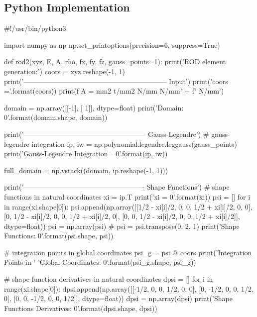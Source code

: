 \subsection{Python Implementation}
\begin{python}
#!/usr/bin/python3

import numpy as np
np.set_printoptions(precision=6, suppress=True)

def rod2(xyz, E, A, rho, fx, fy, fz, gauss_points=1):
    print('\nStarting ROD element generation:\n')
    coors = xyz.reshape(-1, 1)
    print('-------------------------------------------------------------- Input')
    print('coors ='.format(coors))
    print(f'{A = } mm2 t/mm2 N/mm N/mm' +
          f' N/mm\n')

    domain = np.array([[-1],
                       [ 1]], dtype=float)
    print('Domain: {0}\n'.format(domain.shape, domain))

    print('----------------------------------------------------- Gauss-Legendre')
    # gauss-legendre integration
    ip, iw = np.polynomial.legendre.leggauss(gauss_points)
    print('Gauss-Legendre Integration\nip = {0}\n'.format(ip, iw))

    full_domain = np.vstack((domain, ip.reshape(-1, 1)))

    print('---------------------------------------------------- Shape Functions')
    # shape functions in natural coordinates
    xi = ip.T
    print('xi = {0}\n'.format(xi))
    psi = []
    for i in range(xi.shape[0]):
        psi.append(np.array([[1/2 - xi[i]/2, 0, 0, 1/2 + xi[i]/2, 0, 0],
                            [0, 1/2 - xi[i]/2, 0, 0, 1/2 + xi[i]/2, 0],
                            [0, 0, 1/2 - xi[i]/2, 0, 0, 1/2 + xi[i]/2]],
                   dtype=float))
    psi = np.array(psi)
    # psi = psi.transpose(0, 2, 1)
    print('Shape Functions: {0}\n'.format(psi.shape, psi))

    # integration points in global coordinates
    psi_g = psi @ coors
    print('Integration Points in '
          'Global Coordinates: {0}\n'.format(psi_g.shape, psi_g))

    # shape function derivatives in natural coordinates
    dpsi = []
    for i in range(xi.shape[0]):
        dpsi.append(np.array([[-1/2, 0, 0, 1/2, 0, 0],
                              [0, -1/2, 0, 0, 1/2, 0],
                              [0, 0, -1/2, 0, 0, 1/2]], dtype=float))
    dpsi = np.array(dpsi)
    print('Shape Functions Derivatives: {0}\n'.format(dpsi.shape, dpsi))


\end{python}
